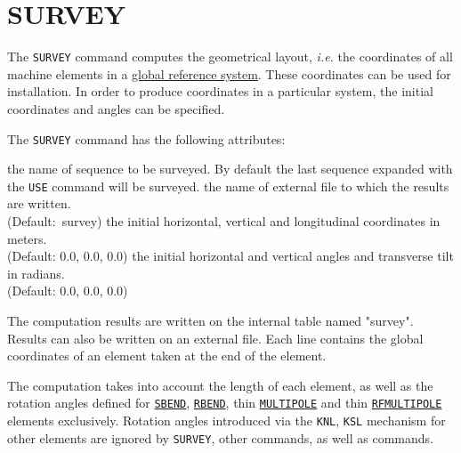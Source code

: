  
\chapter{SURVEY}
\label{chap:survey}

The \texttt{SURVEY} command computes the geometrical layout,
\textsl{i.e.} the coordinates of all machine elements in a 
\hyperref[sec:global-ref]{global reference system}. These
coordinates can be used for installation. In order to produce
coordinates in a particular system, the initial coordinates and angles
can be specified. 


The \texttt{SURVEY} command has the following attributes:
\begin{madlist}
   the name of sequence to be surveyed. By default the
  last sequence expanded with the \texttt{USE} command will be surveyed.  
    the name of external file to which the results are
  written.\\ (Default:~survey)
   the initial horizontal, vertical and longitudinal
  coordinates in meters.\\ (Default: 0.0, 0.0, 0.0) 
   the initial horizontal and vertical angles
  and transverse tilt in radians.\\ (Default: 0.0, 0.0, 0.0)
\end{madlist}

The computation results are written on the internal table named
"survey". Results can also be written on an external file. Each line
contains the global coordinates of an element taken at the end of the
element.

The computation takes into account the length of each element, as well
as the rotation angles defined for \hyperref[bend-sbend]{\texttt{SBEND}},
\hyperref[bend-rbend]{\texttt{RBEND}}, thin
\hyperref[sec:multipole]{\texttt{MULTIPOLE}} and thin
\hyperref[sec:rfmultipole]{\texttt{RFMULTIPOLE}} 
elements exclusively.  Rotation angles introduced via the \texttt{KNL},
\texttt{KSL} mechanism for other elements are ignored by
\texttt{SURVEY}, other \madx commands, as well as \ptc commands. 


